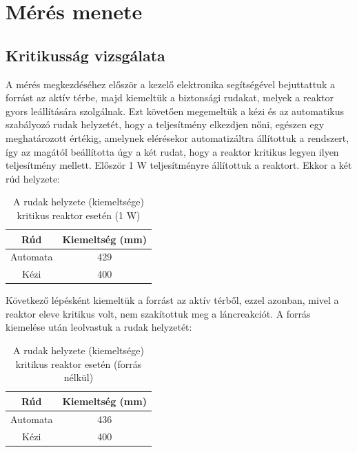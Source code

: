 \documentclass[12pt,a4paper]{article}
\begin{document}
\section{Mérés menete}
\subsection{Kritikusság vizsgálata}
\hspace*{10pt} A mérés megkezdéséhez először a kezelő elektronika segítségével bejuttattuk a forrást az aktív térbe, majd kiemeltük a biztonsági rudakat, melyek a reaktor gyors leállítására szolgálnak. Ezt követően megemeltük a kézi és az automatikus szabályozó rudak helyzetét, hogy a teljesítmény elkezdjen nőni, egészen egy meghatározott értékig, amelynek elérésekor automatizáltra állítottuk a rendszert, így az magától beállította úgy a két rudat, hogy a reaktor kritikus legyen ilyen teljesítmény mellett. Először 1 W teljesítményre állítottuk a reaktort. Ekkor a két rúd helyzete:
\begin{table}[!h]
\begin{center}
\begin{tabular}{|c|c|}
\hline
Rúd & Kiemeltség (mm) \\
\hline
\hline
Automata & 429 \\
\hline
Kézi & 400 \\
\hline
\end{tabular}
\caption{A rudak helyzete (kiemeltsége) kritikus reaktor esetén (1 W)}
\end{center}
\end{table}

\hspace*{10pt} Következő lépésként kiemeltük a forrást az aktív térből, ezzel azonban, mivel a reaktor eleve kritikus volt, nem szakítottuk meg a láncreakciót. A forrás kiemelése után leolvastuk a rudak helyzetét:

\begin{table}[!h]
\begin{center}
\begin{tabular}{|c|c|}
\hline
Rúd & Kiemeltség (mm) \\
\hline
\hline
Automata & 436 \\
\hline
Kézi & 400 \\
\hline
\end{tabular}
\caption{A rudak helyzete (kiemeltsége) kritikus reaktor esetén (forrás nélkül)}
\end{center}
\end{table}
\end{document}
